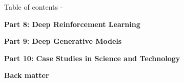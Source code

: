 \begin{frame}[allowframebreaks,t]{Table of contents -}
\vspace{0.2cm}

{\bf Part 8: Deep Reinforcement Learning}\\
\vspace{0.2cm}
\tableofcontents[part=8]

\vspace{0.2cm}

{\bf Part 9: Deep Generative Models}\\
\vspace{0.2cm}
\tableofcontents[part=9]

\vspace{0.2cm}

{\bf Part 10: Case Studies in Science and Technology}\\
\vspace{0.2cm}
\tableofcontents[part=10]

\vspace{0.3cm}

{\bf Back matter}\\
\tableofcontents[part=11]

\end{frame}


